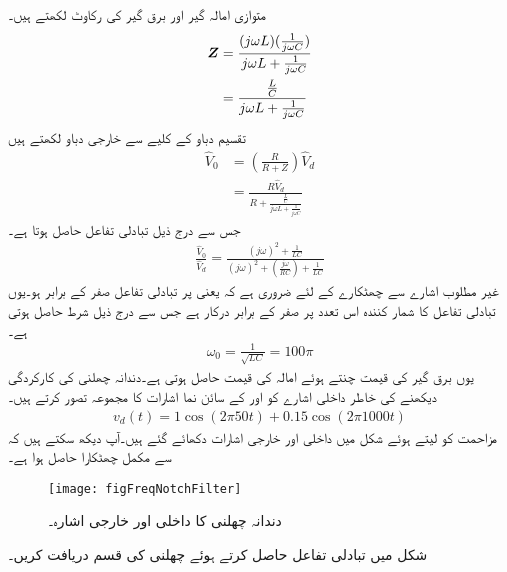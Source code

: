 متوازی امالہ گیر اور برق گیر کی رکاوٹ  لکھتے ہیں۔
\begin{align*}
{\ensuremath{{\boldsymbol{Z}}}}&=\frac{(j\omega L)(\frac{1}{j\omega C})}{j\omega L+\frac{1}{j\omega C}}\\
&=\frac{\frac{L}{C}}{j\omega L+ \frac{1}{j\omega C}}
\end{align*}
تقسیم دباو کے کلیے سے خارجی دباو لکھتے ہیں
\begin{align*}
\hat{V}_0&=\left(\frac{R}{R+Z}\right)\hat{V}_d\\
&=\frac{R \hat{V}_d}{R+\frac{\frac{L}{C}}{j\omega L+ \frac{1}{j\omega C}}}
\end{align*}
جس سے درج ذیل تبادلی تفاعل حاصل ہوتا ہے۔
\begin{align*}
\frac{\hat{V}_0}{\hat{V}_d}=\frac{(j\omega)^2+\frac{1}{LC}}{(j\omega)^2+\left(\frac{j\omega}{RC}\right)+\frac{1}{LC}}
\end{align*}
غیر مطلوب اشارے سے چھٹکارے کے لئے ضروری ہے کہ  یعنی  پر تبادلی تفاعل  صفر کے برابر ہو۔یوں تبادلی تفاعل کا شمار کنندہ اس تعدد پر صفر کے برابر درکار ہے جس سے درج ذیل شرط حاصل ہوتی ہے۔
\begin{align}
\omega_0=\frac{1}{\sqrt{LC}}=100\pi
\end{align}
یوں برق گیر کی قیمت  چنتے ہوئے امالہ کی قیمت  حاصل ہوتی ہے۔دندانہ چھلنی کی کارکردگی دیکھنے کی خاطر داخلی اشارے  کو  اور  کے سائن نما اشارات کا مجموعہ تصور کرتے ہیں۔ 
\begin{align*}
v_d(t)=1\cos (2\pi 50 t)+0.15\cos(2\pi 1000 t)
\end{align*}
مزاحمت کو  لیتے ہوئے شکل  میں داخلی اور خارجی اشارات دکھائے گئے ہیں۔آپ دیکھ سکتے ہیں کہ  سے مکمل چھٹکارا حاصل ہوا ہے۔ 
\begin{figure}
\centering
\texttt{[image: figFreqNotchFilter]}
\caption{دندانہ چھلنی کا داخلی اور خارجی اشارہ۔}
\label{شکل_تعددی_دندانہ_چھلنی_اشارات}
\end{figure}
شکل  میں تبادلی تفاعل حاصل کرتے ہوئے چھلنی کی قسم دریافت کریں۔

